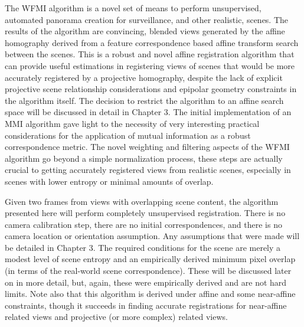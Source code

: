 %
%
%
%
%
%
%
%
%

%
%
%



The WFMI algorithm is a novel set of means to perform unsupervised, automated panorama creation for surveillance, and other realistic, scenes. The results of the algorithm are convincing, blended views generated by the affine homography derived from a feature correspondence based affine transform search between the scenes. This is a robust and novel affine registration algorithm that can provide useful estimations in registering views of scenes that would be more accurately registered by a projective homography, despite the lack of explicit projective scene relationship considerations and epipolar geometry constraints in the algorithm itself. The decision to restrict the algorithm to an affine search space will be discussed in detail in Chapter 3. The initial implementation of an MMI algorithm gave light to the necessity of very interesting practical considerations for the application of mutual information as a robust correspondence metric. The novel weighting and filtering aspects of the WFMI algorithm go beyond a simple normalization process, these steps are actually crucial to getting accurately registered views from realistic scenes, especially in scenes with lower entropy or minimal amounts of overlap.

Given two frames from views with overlapping scene content, the algorithm presented here will perform completely unsupervised registration. There is no camera calibration step, there are no initial correspondences, and there is no camera location or orientation assumption. Any assumptions that were made will be detailed in Chapter 3. The required conditions for the scene are merely a modest level of scene entropy and an empirically derived minimum pixel overlap (in terms of the real-world scene correspondence). These will be discussed later on in more detail, but, again, these were empirically derived and are not hard limits. Note also that this algorithm is derived under affine and some near-affine constraints, though it succeeds in finding accurate registrations for near-affine related views and projective (or more complex) related views.

